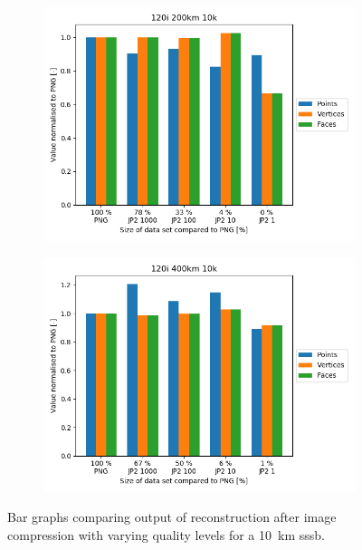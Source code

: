 \begin{figure}[htb]
        \begin{subfigure}[b]{0.49\textwidth}
            \centering
            \includegraphics[width=\textwidth]{doc/thesis/0_figures/recon/120i_200km_10k.png}
            \caption{}
            \label{fig:recon_120_200_10}
        \end{subfigure}
        \begin{subfigure}[b]{0.49\textwidth}
            \centering
            \includegraphics[width=\textwidth]{doc/thesis/0_figures/recon/120i_400km_10k.png}
            \caption{}
            \label{fig:recon_120_400_10}
        \end{subfigure}
    \caption{Bar graphs comparing output of reconstruction after image compression with varying quality levels for a \SI{10}{\kilo\meter} \gls{sssb}.}
    \label{fig:recon_stats_10}
\end{figure}

